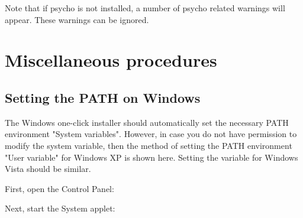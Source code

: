 \documentclass{manual}
\begin{document}
Note that if psycho is not installed, a number of psycho related warnings will appear. These warnings 
can be ignored.

%
%
%
%


\appendix
\chapter{Miscellaneous procedures}
\section{Setting the PATH on Windows}
\label{sec:setwindowspath}

The Windows one-click installer should automatically set the necessary PATH 
environment "System variables". However, in case you do not have
permission to modify the system variable, then the method of setting the PATH environment "User variable" 
for Windows XP is shown here. Setting the variable for Windows Vista should be similar.

\setlength\fboxsep{0pt}
\setlength\fboxrule{1.0pt}

First, open the Control Panel:
\begin{figure}[ht]
  \centerline{}
  \label{fig:winsetpath1}
\end{figure}

Next, start the System applet:
\begin{figure}[ht]
  \centerline{}
  \label{fig:winsetpath2}
\end{figure}
\end{document}
